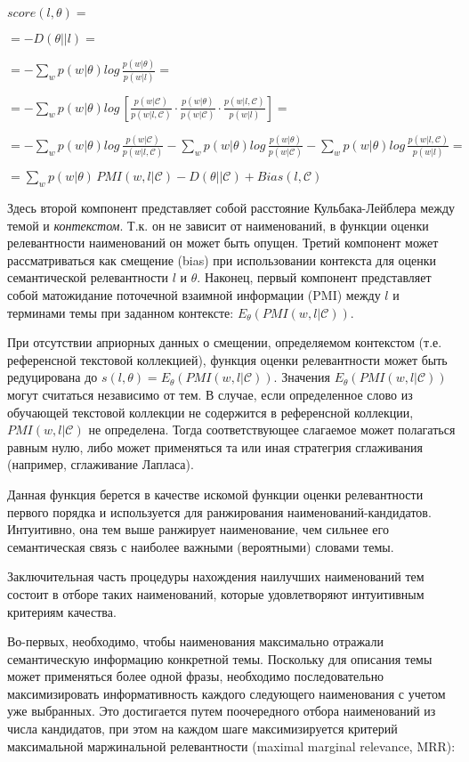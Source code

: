 $score(l, \theta) =$

$= -D(\theta||l) =$

$= -\sum_{w}p(w|\theta)log\,\frac{p(w|\theta)}{p(w|l)} =$

$= -\sum_{w}p(w|\theta)log\,[\frac{p(w|\mathcal{C})}{p(w|l,\mathcal{C})}\cdot  \frac{p(w|\theta)}{p(w|\mathcal{C})}\cdot\frac{p(w|l,\mathcal{C})}{p(w|l)}] =$

$= -\sum_{w}p(w|\theta)log\,\frac{p(w|\mathcal{C})}{p(w|l,\mathcal{C})} -\sum_{w}p(w|\theta)log\,\frac{p(w|\theta)}{p(w|\mathcal{C})} -\sum_{w}p(w|\theta)log\,\frac{p(w|l,\mathcal{C})}{p(w|l)} =$

$= \sum_{w}p(w|\theta)\,PMI(w,l|\mathcal{C}) - D(\theta||\mathcal{C}) + Bias(l, \mathcal{C})$

\noindent Здесь второй компонент представляет собой расстояние Кульбака-Лейблера между темой и \textit{контекстом}. Т.к. он не зависит от наименований, в функции оценки релевантности наименований он может быть опущен. Третий компонент может рассматриваться как смещение (bias) при использовании контекста для оценки семантической релевантности $l$ и $\theta$. Наконец, первый компонент представляет собой матожидание поточечной взаимной информации (PMI) между $l$ и терминами темы при заданном контексте: $E_\theta(PMI(w,l|\mathcal{C}))$.

При отсутствии априорных данных о смещении, определяемом контекстом (т.е. референсной текстовой коллекцией), функция оценки релевантности может быть редуцирована до $s(l,\theta) = E_\theta(PMI(w,l|\mathcal{C}))$. Значения $E_\theta(PMI(w,l|\mathcal{C}))$ могут считаться независимо от тем. В случае, если определенное слово из обучающей текстовой коллекции не содержится в референсной коллекции, $PMI(w,l|\mathcal{C})$ не определена. Тогда соответствующее слагаемое может полагаться равным нулю, либо может применяться та или иная стратегрия сглаживания (например, сглаживание Лапласа). 

Данная функция берется в качестве искомой функции оценки релевантности первого порядка и используется для ранжирования наименований-кандидатов. Интуитивно, она тем выше ранжирует наименование, чем сильнее его семантическая связь с наиболее важными (вероятными) словами темы.

Заключительная часть процедуры нахождения наилучших наименований тем состоит в отборе таких наименований, которые удовлетворяют интуитивным критериям качества. 

Во-первых, необходимо, чтобы наименования максимально отражали семантическую информацию конкретной темы. Поскольку для описания темы может применяться более одной фразы, необходимо последовательно максимизировать информативность каждого следующего наименования с учетом уже выбранных. Это достигается путем поочередного отбора наименований из числа кандидатов, при этом на каждом шаге максимизируется критерий максимальной маржинальной релевантности (maximal marginal relevance, MRR):

